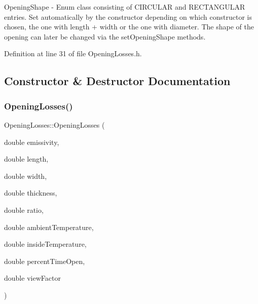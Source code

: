 Opening\+Shape -\/ Enum class consisting of C\+I\+R\+C\+U\+L\+AR and R\+E\+C\+T\+A\+N\+G\+U\+L\+AR entries. Set automatically by the constructor depending on which constructor is chosen, the one with length + width or the one with diameter. The shape of the opening can later be changed via the set\+Opening\+Shape methods. 

Definition at line 31 of file Opening\+Losses.\+h.



\subsection{Constructor \& Destructor Documentation}
\mbox{\label{class_opening_losses_a74205733c9a9b328bd9bf15c73841a8f}} 
\subsubsection{\texorpdfstring{Opening\+Losses()}{OpeningLosses()}\hspace{0.1cm}{\footnotesize\ttfamily [1/6]}}
{\footnotesize\ttfamily Opening\+Losses\+::\+Opening\+Losses (\begin{DoxyParamCaption}\item[{double}]{emissivity,  }\item[{double}]{length,  }\item[{double}]{width,  }\item[{double}]{thickness,  }\item[{double}]{ratio,  }\item[{double}]{ambient\+Temperature,  }\item[{double}]{inside\+Temperature,  }\item[{double}]{percent\+Time\+Open,  }\item[{double}]{view\+Factor }\end{DoxyParamCaption})\hspace{0.3cm}{\ttfamily [inline]}}

